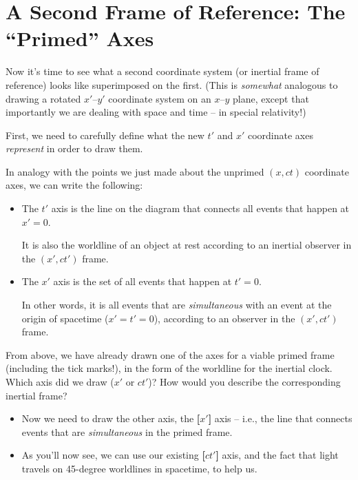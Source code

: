 \documentclass[11pt, letterpaper, openany]{book}
\newenvironment{exercise}[1][Exercise]{%
  \tcolorbox[blanker, breakable, left=1em,
    before skip=1em, after skip=1em,
    borderline west={3pt}{0pt}{PhysNavy},
    colback=PhysCream,
    before upper={\textcolor{PhysNavy}{\sffamily\bfseries #1:}\space}
  ]%
}{%
  \endtcolorbox%
}
\begin{document}
\section{A Second Frame of Reference: The ``Primed'' Axes}

Now it's time to see what a second coordinate system (or inertial frame of reference) looks like superimposed on the first. (This is \textit{somewhat} analogous to drawing a rotated $x'$--$y'$ coordinate system on an $x$--$y$ plane, except that importantly we are dealing with space and time -- in special relativity!)

First, we need to carefully define what the new $t'$ and $x'$ coordinate axes \textit{represent} in order to draw them.

In analogy with the points we just made about the unprimed $(x, ct)$ coordinate axes, we can write the following:
\begin{itemize}
    \item The $t'$ axis is the line on the diagram that connects all events that happen at $x'=0$.
    
    It is also the worldline of an object at rest according to an inertial observer in the $(x', ct')$ frame.
    \item The $x'$ axis is the set of all events that happen at $t'=0$.
    
    In other words, it is all events that are \textit{simultaneous} with an event at the origin of spacetime ($x'=t'=0$), according to an observer in the $(x', ct')$ frame.
\end{itemize}

\begin{exercise}[Quick Question]
From above, we have already drawn one of the axes for a viable primed frame (including the tick marks!), in the form of the worldline for the inertial clock. Which axis did we draw ($x'$ or $ct'$)? How would you describe the corresponding inertial frame?
\end{exercise}

\begin{itemize}
    \item Now we need to draw the other axis, the \textbf{[$x'$]} axis -- i.e., the line that connects events that are \textit{simultaneous} in the primed frame.
    \item As you'll now see, we can use our existing \textbf{[$ct'$]} axis, and the fact that light travels on 45-degree worldlines in spacetime, to help us.
\end{itemize}
\end{document}

